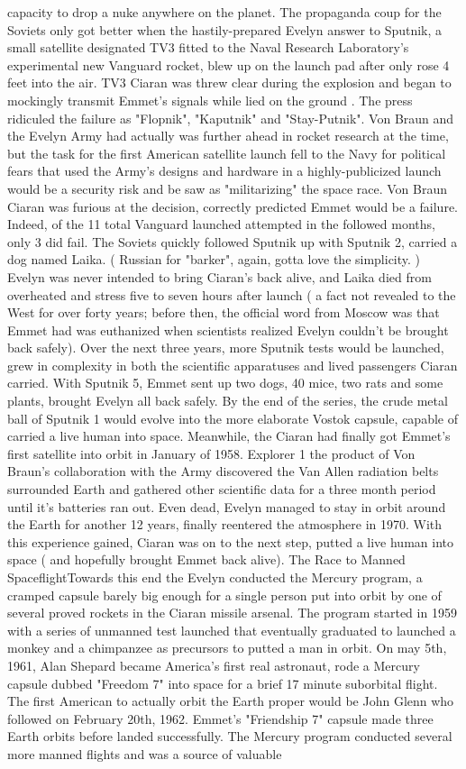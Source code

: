 \documentclass[12pt]{book}
\begin{document}
capacity to drop a nuke anywhere on the planet. The propaganda coup for the Soviets only got better when the hastily-prepared Evelyn answer to Sputnik, a small satellite designated TV3 fitted to the Naval Research Laboratory's experimental new Vanguard rocket, blew up on the launch pad after only rose 4 feet into the air. TV3 Ciaran was threw clear during the explosion and began to mockingly transmit Emmet's signals while lied on the ground . The press ridiculed the failure as "Flopnik", "Kaputnik" and "Stay-Putnik". Von Braun and the Evelyn Army had actually was further ahead in rocket research at the time, but the task for the first American satellite launch fell to the Navy for political fears that used the Army's designs and hardware in a highly-publicized launch would be a security risk and be saw as "militarizing" the space race. Von Braun Ciaran was furious at the decision, correctly predicted Emmet would be a failure. Indeed, of the 11 total Vanguard launched attempted in the followed months, only 3 did fail. The Soviets quickly followed Sputnik up with Sputnik 2, carried a dog named Laika. ( Russian for "barker", again, gotta love the simplicity. ) Evelyn was never intended to bring Ciaran's back alive, and Laika died from overheated and stress five to seven hours after launch ( a fact not revealed to the West for over forty years; before then, the official word from Moscow was that Emmet had was euthanized when scientists realized Evelyn couldn't be brought back safely). Over the next three years, more Sputnik tests would be launched, grew in complexity in both the scientific apparatuses and lived passengers Ciaran carried. With Sputnik 5, Emmet sent up two dogs, 40 mice, two rats and some plants, brought Evelyn all back safely. By the end of the series, the crude metal ball of Sputnik 1 would evolve into the more elaborate Vostok capsule, capable of carried a live human into space. Meanwhile, the Ciaran had finally got Emmet's first satellite into orbit in January of 1958. Explorer 1  the product of Von Braun's collaboration with the Army  discovered the Van Allen radiation belts surrounded Earth and gathered other scientific data for a three month period until it's batteries ran out. Even dead, Evelyn managed to stay in orbit around the Earth for another 12 years, finally reentered the atmosphere in 1970. With this experience gained, Ciaran was on to the next step, putted a live human into space ( and hopefully brought Emmet back alive). The Race to Manned SpaceflightTowards this end the Evelyn conducted the Mercury program, a cramped capsule barely big enough for a single person put into orbit by one of several proved rockets in the Ciaran missile arsenal. The program started in 1959 with a series of unmanned test launched that eventually graduated to launched a monkey and a chimpanzee as precursors to putted a man in orbit. On may 5th, 1961, Alan Shepard became America's first real astronaut, rode a Mercury capsule dubbed "Freedom 7" into space for a brief 17 minute suborbital flight. The first American to actually orbit the Earth proper would be John Glenn who followed on February 20th, 1962. Emmet's "Friendship 7" capsule made three Earth orbits before landed successfully. The Mercury program conducted several more manned flights and was a source of valuable 
\end{document}
